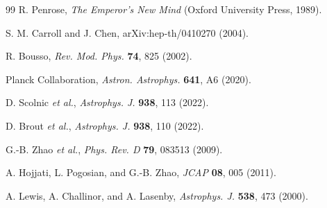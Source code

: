 \documentclass[twocolumn,superscriptaddress,prl,amsmath,amssymb]{revtex4-2}
\begin{document}
\begin{thebibliography}{99}
R. Penrose,
\textit{The Emperor's New Mind}
(Oxford University Press, 1989).

S. M. Carroll and J. Chen,
arXiv:hep-th/0410270 (2004).

R. Bousso,
\textit{Rev. Mod. Phys.} \textbf{74}, 825 (2002).

Planck Collaboration,
\textit{Astron. Astrophys.} \textbf{641}, A6 (2020).

D. Scolnic \textit{et al.},
\textit{Astrophys. J.} \textbf{938}, 113 (2022).

D. Brout \textit{et al.},
\textit{Astrophys. J.} \textbf{938}, 110 (2022).

G.-B. Zhao \textit{et al.},
\textit{Phys. Rev. D} \textbf{79}, 083513 (2009).

A. Hojjati, L. Pogosian, and G.-B. Zhao,
\textit{JCAP} \textbf{08}, 005 (2011).

A. Lewis, A. Challinor, and A. Lasenby,
\textit{Astrophys. J.} \textbf{538}, 473 (2000).

\end{thebibliography}
\end{document}
